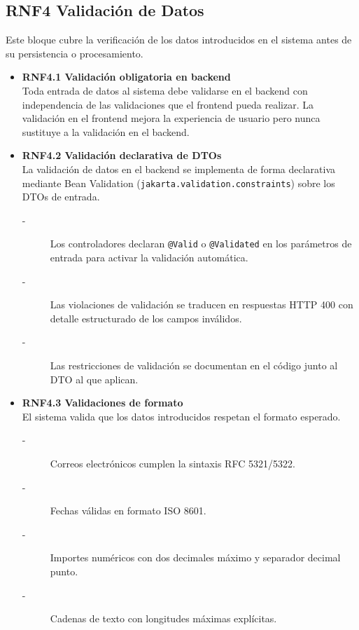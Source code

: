 \subsection{RNF4 Validación de Datos}
Este bloque cubre la verificación de los datos introducidos en el
sistema antes de su persistencia o procesamiento.
\begin{itemize}
    \item \textbf{RNF4.1 Validación obligatoria en backend} \\
    Toda entrada de datos al sistema debe validarse en el backend con
    independencia de las validaciones que el frontend pueda realizar. La validación en el frontend mejora la experiencia de usuario pero
    nunca sustituye a la validación en el backend.


    \item \textbf{RNF4.2 Validación declarativa de DTOs} \\
    La validación de datos en el backend se implementa de forma
    declarativa mediante Bean Validation (\texttt{jakarta.validation.constraints})
    sobre los DTOs de entrada.
    \begin{description}
        \item[-] Los controladores declaran \texttt{@Valid} o \texttt{@Validated} en los
        parámetros de entrada para activar la validación automática. 
        \item[-] Las violaciones de validación se traducen en respuestas HTTP 400
        con detalle estructurado de los campos inválidos.
        \item[-] Las restricciones de validación se documentan en el código junto al DTO al que aplican.
    \end{description}


    \item \textbf{RNF4.3 Validaciones de formato} \\
    El sistema valida que los datos introducidos respetan el formato esperado.
    \begin{description}
        \item[-] Correos electrónicos cumplen la sintaxis RFC 5321/5322.
        \item[-] Fechas válidas en formato ISO 8601.
        \item[-] Importes numéricos con dos decimales máximo y separador decimal punto.   
        \item[-] Cadenas de texto con longitudes máximas explícitas.
    \end{description}



\end{itemize}
